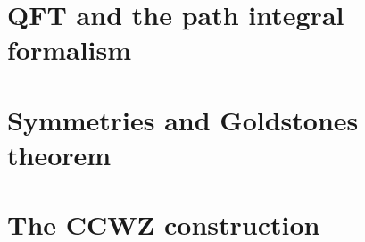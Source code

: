 

\section{QFT and the path integral formalism}

\section{Symmetries and Goldstones theorem}

\section{The CCWZ construction}